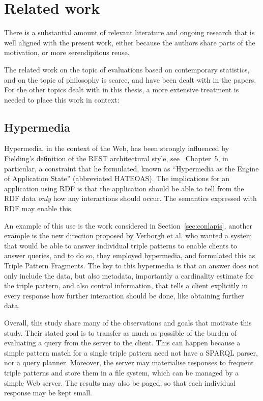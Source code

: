 \section{Related work}\label{sec:related}

There is a substantial amount of relevant literature and ongoing
research that is well aligned with the present work, either because
the authors share parts of the motivation, or more serendipitous
reuse.

The related work on the topic of evaluations based on contemporary
statistics, and on the topic of philosophy is scarce, and have been
dealt with in the papers. For the other topics dealt with in this
thesis, a more extensive treatment is needed to place this work in
context:

\subsection{Hypermedia}

Hypermedia, in the context of the Web, has been strongly influenced by
Fielding's definition of the REST architectural style, see
\cite{Fielding_2000_Architectural-Styles}~Chapter~5, in particular, a
constraint that he formulated, known as ``Hypermedia as the Engine of
Application State'' (abbreviated HATEOAS). The implications for an
application using RDF is that the application should be able to tell
from the RDF data \emph{only} how any interactions should occur. The
semantics expressed with RDF may enable this.

An example of this use is the work considered in
Section~\ref{sec:conlapis}, another example is the new direction
proposed by Verborgh et al. \cite{ldf1} who wanted a system that would
be able to answer individual triple patterns to enable clients to
answer queries, and to do so, they employed hypermedia, and formulated
this as Triple Pattern Fragments. The key to this hypermedia is that
an answer does not only include the data, but also metadata,
importantly a cardinality estimate for the triple pattern, and also
control information, that tells a client explicitly in every response
how further interaction should be done, like obtaining further data.

Overall, this study share many of the observations and goals that
motivate this study. Their stated goal is to transfer as much as
possible of the burden of evaluating a query from the server to the
client. This can happen because a simple pattern match for a single
triple pattern need not have a SPARQL parser, nor a query
planner. Moreover, the server may materialise responses to frequent
triple patterns and store them in a file system, which can be managed
by a simple Web server. The results may also be paged, so that each
individual response may be kept small. 

